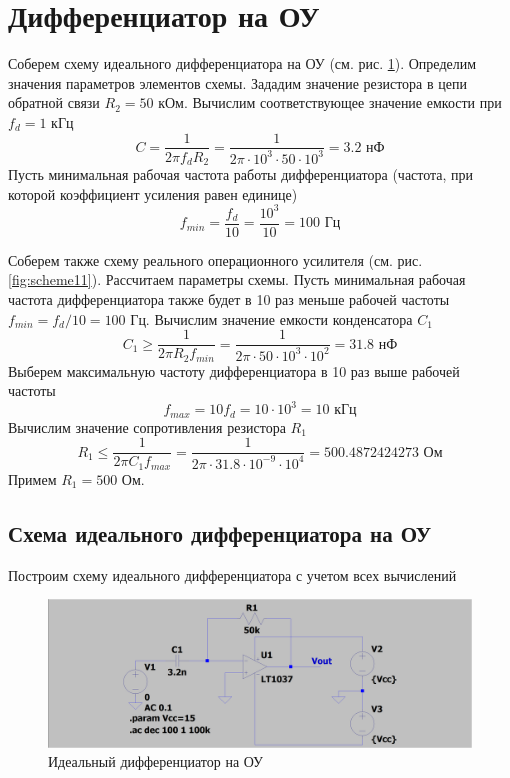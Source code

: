 \documentclass[a4paper, 12pt]{article}
\begin{document}
    \section{Дифференциатор на ОУ}
    Соберем схему идеального дифференциатора на ОУ (см. рис. \ref{fig:scheme10}). Определим значения
    параметров элементов схемы. Зададим значение резистора в цепи
    обратной связи $R_2=50$ кОм. Вычислим соответствующее значение емкости
    при $f_d=1$ кГц
    $$
    C=\dfrac{1}{2\pi f_d R_2}=\dfrac{1}{2\pi\cdot10^3\cdot50\cdot10^3}=3.2\text{ нФ}
    $$
    Пусть минимальная рабочая частота работы дифференциатора
    (частота, при которой коэффициент усиления равен единице)
    $$
    f_{min}=\dfrac{f_d}{10}=\dfrac{10^3}{10}=100\text{ Гц}
    $$


    Соберем также схему реального операционного усилителя (см. рис. \ref{fig:scheme11}). Рассчитаем параметры схемы.
    Пусть минимальная рабочая частота дифференциатора также будет в 10 раз меньше
    рабочей частоты $f_{min}=f_d/10=100$ Гц. Вычислим значение емкости конденсатора $C_1$
    $$
    C_1\geq\dfrac{1}{2\pi R_2f_{min}}=\dfrac{1}{2\pi\cdot50\cdot10^3\cdot10^2}=31.8\text{ нФ}
    $$
    Выберем максимальную частоту дифференциатора в 10 раз выше рабочей частоты
    $$
    f_{max}=10f_d=10\cdot10^3=10\text{ кГц}
    $$
    Вычислим значение сопротивления резистора $R_1$
    $$
    R_1\leq\dfrac{1}{2\pi C_1f_{max}}=\dfrac{1}{2\pi\cdot31.8\cdot10^{-9}\cdot10^4}=500.4872424273\text{ Ом}
    $$
    Примем $R_1=500$ Ом.


    \subsection{Схема идеального дифференциатора на ОУ}
    Построим схему идеального дифференциатора с учетом всех вычислений
    \begin{figure}[H]
        \centering
        \includegraphics[scale=0.22]{scheme10.png}
        \captionsetup{skip=0pt}
        \caption{Идеальный дифференциатор на ОУ}
        \label{fig:scheme10}
    \end{figure}
\end{document}
